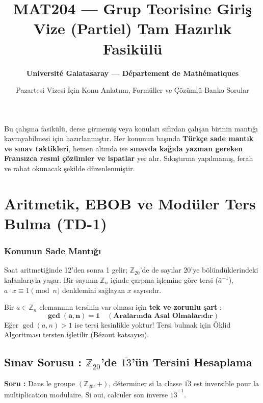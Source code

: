 \documentclass[11pt,a4paper]{article}
\title{\textbf{MAT204 — Grup Teorisine Giriş\\ \Large Vize (Partiel) Tam Hazırlık Fasikülü}}
\author{\textbf{Université Galatasaray — Département de Mathématiques}}
\date{Pazartesi Vizesi İçin Konu Anlatımı, Formüller ve Çözümlü Banko Sorular}
\begin{document}
\shorthandoff{=}
\maketitle

\begin{tcolorbox}[colback=blue!5!white,colframe=blue!75!black,title=\textbf{Bu Fasikül Nasıl Kullanılmalı?}]
Bu çalışma fasikülü, derse girmemiş veya konuları sıfırdan çalışan birinin mantığı kavrayabilmesi için hazırlanmıştır. 
Her konunun başında \textbf{Türkçe sade mantık ve sınav taktikleri}, hemen altında ise \textbf{sınavda kağıda yazman gereken Fransızca resmi çözümler ve ispatlar} yer alır. 
Sıkıştırma yapılmamış, ferah ve rahat okunacak şekilde düzenlenmiştir.
\end{tcolorbox}

\vspace{0.5cm}

\section{Aritmetik, EBOB ve Modüler Ters Bulma (TD-1)}

\subsubsection*{Konunun Sade Mantığı}
Saat aritmetiğinde 12'den sonra 1 gelir; $\mathbb{Z}_{20}$'de de sayılar 20'ye bölündüklerindeki kalanlarıyla yaşar. 
Bir sayının $\mathbb{Z}_n$ içinde çarpma işlemine göre tersi ($\bar{a}^{-1}$), $a \cdot x \equiv 1 \pmod n$ denklemini sağlayan $x$ sayısıdır.

\begin{tcolorbox}[colback=red!5!white,colframe=red!75!black,title=Altın Kural : Ters Elemanın Varlık Şartı]
Bir $\bar{a} \in \mathbb{Z}_n$ elemanının tersinin var olması için \textbf{tek ve zorunlu şart} :
\[ \mathbf{\gcd(a, n) = 1 \quad (\text{Aralarında Asal Olmalarıdır})} \]
Eğer $\gcd(a, n) > 1$ ise tersi kesinlikle yoktur! Tersi bulmak için Öklid Algoritması tersten işletilir (Bézout katsayısı).
\end{tcolorbox}

\subsection*{Sınav Sorusu : $\mathbb{Z}_{20}$'de $\bar{13}$'ün Tersini Hesaplama}
\textbf{Soru :} Dans le groupe $(\mathbb{Z}_{20}, +)$, déterminer si la classe $\bar{13}$ est inversible pour la multiplication modulaire. Si oui, calculer son inverse $\bar{13}^{-1}$.
\end{document}

